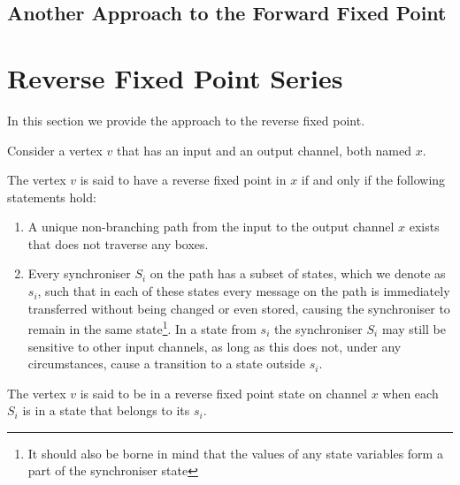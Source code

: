     \subsection{Another Approach to the Forward Fixed Point}
%



    \section{Reverse Fixed Point Series\label{rfp}}
In this section we provide the approach to the reverse fixed point.

Consider a vertex $v$ that has an input and an output channel, both named $x$.

\begin{definition} The vertex $v$ is said to have a reverse fixed point in $x$ if and only if the following statements hold:

\begin{enumerate}
\item A unique non-branching path from the input to the output channel $x$ exists that does not traverse any boxes.

\item Every synchroniser $S_i$ on the path has a subset of states, which we denote as $s_i$, such that in each of these states every message on the path is immediately transferred without being changed or even stored, causing the synchroniser to remain in the same state\footnote{It should also be borne in mind that the values of any state variables form a part of the synchroniser state}. In a state from $s_i$ the synchroniser $S_i$ may still be sensitive to other input channels, as long as this does not, under any circumstances, cause a transition to a state outside $s_i$.
\end{enumerate}
\end{definition}

The vertex $v$ is said to be in a reverse fixed point state on channel $x$ when each $S_i$ is in a state that belongs to its $s_i$.


